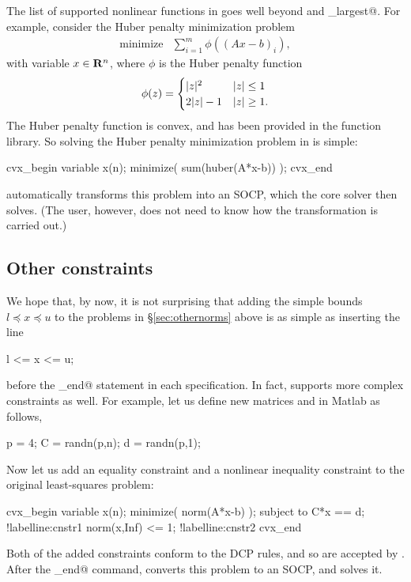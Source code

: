 \documentclass[12pt]{article}
\begin{document}
The list of supported nonlinear functions in \cvx 
goes well beyond \verb@norm@ and \verb@norm_largest@.
For example, consider the Huber penalty minimization problem
\[
	\begin{array}{ll}
		\text{minimize} & \sum_{i=1}^m \phi( (Ax-b)_i ),
	\end{array}
\]
with variable $x \in \mathbf{R}^n$, where $\phi$ is the Huber penalty
function
\[
	\phi(z) =\begin{cases}  |z|^2 & |z|\leq 1 \\ 2|z|-1 & |z|\geq 1. \end{cases}
\]
The Huber penalty function is convex, and has been provided in the \cvx
function library.  So solving the Huber penalty minimization 
problem in \cvx is simple:
\begin{code2}[firstnumber=205]
	cvx_begin
	    variable x(n);
	    minimize( sum(huber(A*x-b)) );
	cvx_end
\end{code2}
\cvx automatically transforms this problem into an SOCP,
which the core solver then solves.
(The \cvx user, however, does not need to know how the transformation is 
carried out.)

\subsection{Other constraints}
\label{sec:constraints}

We hope that, by now, it is not surprising that adding the simple bounds 
$l\preceq x\preceq u$ to the problems in \S\ref{sec:othernorms} above
is as simple as inserting the line
\begin{code}
	l <= x <= u;
\end{code}
before the \verb@cvx_end@
statement in each \cvx specification. In fact, 
\cvx supports more complex constraints as well.
For example, let us define new matrices \verb@C@ and \verb@d@ in Matlab
as follows,
\begin{code2}[firstnumber=228]
	p = 4;
	C = randn(p,n);
	d = randn(p,1);
\end{code2}
Now let us add an equality constraint and a nonlinear inequality
constraint to the original least-squares problem:
\begin{code2}[firstnumber=233]
	cvx_begin
	    variable x(n);
	    minimize( norm(A*x-b) );
	    subject to
	        C*x == d;		!label{line:cnstr1}
	        norm(x,Inf) <= 1;	!label{line:cnstr2}
	cvx_end
\end{code2}
Both of the added constraints conform to the DCP rules, and so are accepted
by \cvx.  After the \verb@cvx_end@ command, 
\cvx converts this problem to an SOCP, and solves it.
\end{document}
